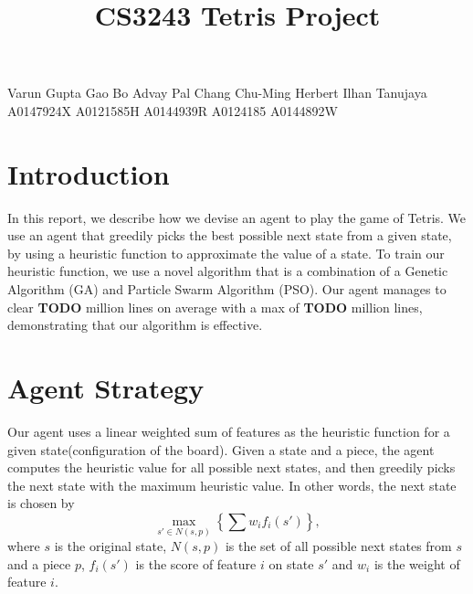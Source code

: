 \documentclass[12pt]{article}
\title{CS3243 Tetris Project}
\author{}
\date{}
\begin{document}
	\vspace{-4cm}
	\maketitle
	\thispagestyle{empty}
	\vspace{-3cm}

	\begin{center}
		{\small Varun Gupta \;\;\;\;\;\;\;\;\;  Gao Bo \;\;\;\;\;\; Advay Pal \;\;\;\;\;\;\; Chang Chu-Ming \;\;\;\; Herbert Ilhan Tanujaya}\\
		{\small A0147924X \;\;\;\;\;\;  A0121585H \;\;\;\; A0144939R \;\;\;\;\;\;\;\; A0124185 \;\;\;\;\;\;\;\;\;\;\;\;\;\; A0144892W \;\;\;\;\;\;\;\;\;\;\;\;\;\;\; }
	\end{center}

    \section{Introduction}
	\vspace{-0.3cm}
    In this report, we describe how we devise an agent to play the game of Tetris.
    We use an agent that greedily picks the best possible next state from a given state,
    by using a heuristic function to approximate the value of a state. To train our heuristic
    function, we use a novel algorithm that is a combination of a Genetic Algorithm (GA)
    and Particle Swarm Algorithm (PSO). Our agent manages to clear \textbf{TODO} million lines on average with a max
    of \textbf{TODO} million lines, demonstrating that our algorithm is effective.

	\vspace{-0.3cm}
    \section{Agent Strategy}
	\vspace{-0.3cm}
	Our agent uses a linear weighted sum of features as the heuristic function for
	a given state(configuration of the board). Given a
	state and a piece, the agent computes the heuristic value for all possible next
	states, and then greedily picks the next state with the maximum heuristic
	value. In other words, the next state is chosen by \small \[ \max_{s' \in N(s, p)}
	\left\{ \sum w_i f_i(s') \right\}, \] \normalsize where $s$ is the original state, $N(s,
	p)$ is the set of all possible next states from $s$ and a piece $p$, $f_i(s')$
	is the score of feature $i$ on state $s'$ and $w_i$ is the weight of feature
	$i$.
\end{document}
